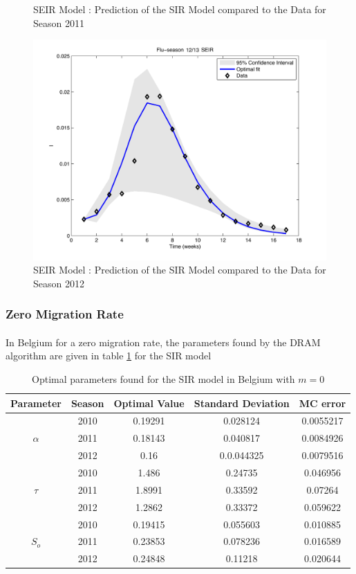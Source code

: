 \documentclass[11pt, a4paper]{article}
\begin{document}
\begin{figure}[h]
    \caption{SEIR Model : Prediction of the SIR Model compared to the Data for Season 2011}
    \label{fig:seir_pred2}
    \includegraphics[height = 0.25\textheight]{figures/SEIR_prediction_season3.pdf}
    \caption{SEIR Model : Prediction of the SIR Model compared to the Data for Season 2012}
    \label{fig:seir_pred3}
\end{figure}

\subsubsection{Zero Migration Rate}
\paragraph{}
In Belgium for a zero migration rate, the parameters found by the DRAM algorithm are given in table \ref{tab:sirm0DRAM} for the SIR model
\begin{table}[h]
\FloatBarrier
\centering
\begin{tabular}{| c | c | c | c | c |}
    \hline
    Parameter & Season & Optimal Value &  Standard Deviation & MC error\\ \hline
    \multirow{3}{*}{$\alpha$} & 2010 & 0.19291 & 0.028124 & 0.0055217 \\
    & 2011 & 0.18143 & 0.040817 & 0.0084926 \\
    & 2012 & 0.16 & 0.0.044325 & 0.0079516 \\ \hline
    \multirow{3}{*}{$\tau$} & 2010 & 1.486 & 0.24735 & 0.046956\\ 
    & 2011 & 1.8991 & 0.33592 & 0.07264 \\ 
    & 2012 & 1.2862 & 0.33372 & 0.059622 \\ \hline
    \multirow{3}{*}{$S_o$} & 2010 & 0.19415 & 0.055603 & 0.010885 \\
    & 2011 & 0.23853 & 0.078236 & 0.016589 \\ 
    & 2012 & 0.24848 & 0.11218 & 0.020644 \\ \hline
    \end{tabular}
    \caption{Optimal parameters found for the SIR model in Belgium with $m=0$}
    \label{tab:sirm0DRAM}
\end{table}
\end{document}
